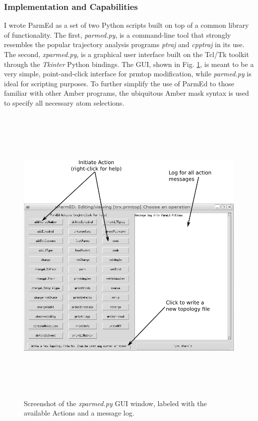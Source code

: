 \subsubsection{Implementation and Capabilities}

I wrote ParmEd as a set of two Python scripts built on top of a common library
of functionality. The first, \emph{parmed.py}, is a command-line tool that
strongly resembles the popular trajectory analysis programs \emph{ptraj} and
\emph{cpptraj} in its use. The second, \emph{xparmed.py}, is a graphical user
interface built on the Tcl/Tk toolkit through the \emph{Tkinter} Python
bindings. The GUI, shown in Fig. \ref{fig6:xparmed}, is meant to be a very
simple, point-and-click interface for prmtop modification, while
\emph{parmed.py} is ideal for scripting purposes. To further simplify the use of
ParmEd to those familiar with other Amber programs, the ubiquitous Amber mask
syntax is used to specify all necessary atom selections.

\begin{figure}
   \includegraphics[width=6.5in, height=5.91in]{xparmed.png}
   \caption{Screenshot of the \emph{xparmed.py} GUI window, labeled with the
            available Actions and a message log.}
   \label{fig6:xparmed}
\end{figure}

